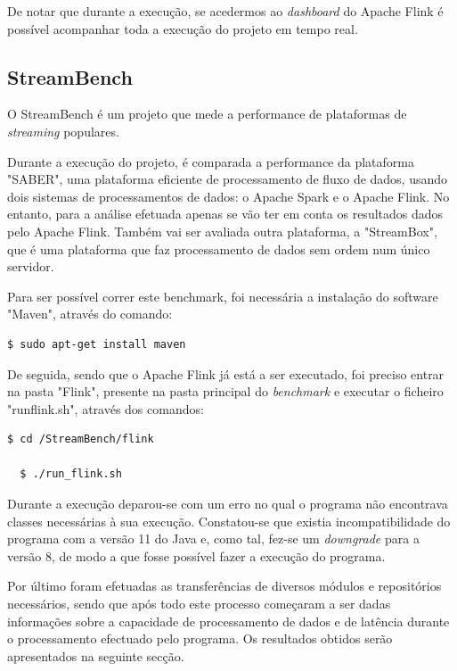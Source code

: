 \documentclass[conference]{IEEEtran}
\begin{document}
De notar que durante a execução, se acedermos ao \emph{dashboard} do Apache Flink é possível acompanhar toda a execução do projeto em tempo real.

\subsection{StreamBench}
\label{stream}

O StreamBench é um projeto que mede a performance de plataformas de \emph{streaming} populares.

Durante a execução do projeto, é comparada a performance da plataforma "SABER", uma plataforma eficiente de processamento de fluxo de dados, usando dois sistemas de processamentos de dados: o Apache Spark e o Apache Flink. No entanto, para a análise efetuada apenas se vão ter em conta os resultados dados pelo Apache Flink. Também vai ser avaliada outra plataforma, a "StreamBox", que é uma plataforma que faz processamento de dados sem ordem num único servidor.

Para ser possível correr este benchmark, foi necessária a instalação do software "Maven", através do comando:

\begin{lstlisting}[language=bash]
  $ sudo apt-get install maven
\end{lstlisting}

De seguida, sendo que o Apache Flink já está a ser executado, foi preciso entrar na pasta "Flink", presente na pasta principal do \emph{benchmark} e executar o ficheiro "run\textunderscore flink.sh", através dos comandos:

\begin{lstlisting}[language=bash]
  $ cd /StreamBench/flink
  
  $ ./run_flink.sh
\end{lstlisting}

Durante a execução deparou-se com um erro no qual o programa não encontrava classes necessárias à sua execução. Constatou-se que existia incompatibilidade do programa com a versão 11 do Java e, como tal, fez-se um \emph{downgrade} para a versão 8, de modo a que fosse possível fazer a execução do programa.

Por último foram efetuadas as transferências de diversos módulos e repositórios necessários, sendo que após todo este processo começaram a ser dadas informações sobre a capacidade de processamento de dados e de latência durante o processamento efectuado pelo programa. Os resultados obtidos serão apresentados na seguinte secção.
\end{document}
